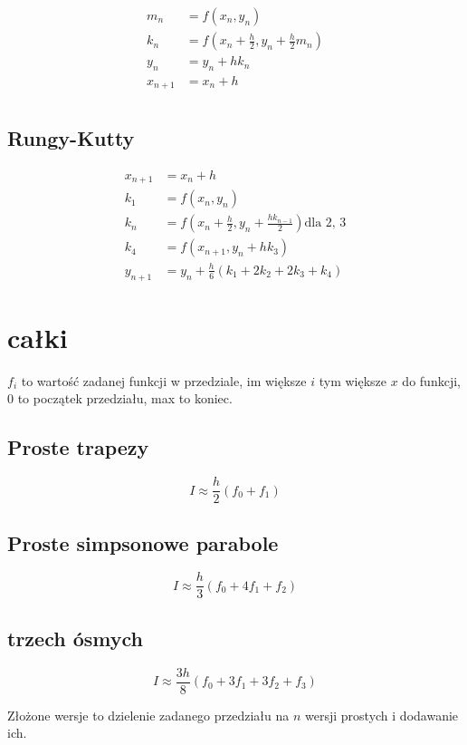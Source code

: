 \documentclass[a5paper,10pt]{article}
\begin{document}
\begin{multicols}{2}
    \begin{align*}
        m_n &= f(x_n, y_n) \\
        k_n &= f\left( x_n + \frac{h}{2}, y_n + \frac{h}{2}m_n \right)\\
        y_n &= y_n + hk_n \\
        x_{n + 1} &= x_{n} + h \\
    \end{align*}

    \subsection{Rungy-Kutty}

    \begin{align*}
        x_{n+1} &= x_n + h \\
        k_1 &= f(x_n, y_n) \\
        k_n &= f\left( x_n + \frac{h}{2}, y_n + \frac{hk_{n-1}}{2} \right)
            \text{dla 2, 3} \\
        k_4 &= f\left( x_{n+1}, y_n + hk_3 \right)\\
        y_{n+1} &= y_n + \frac{h}{6}\left( k_1 + 2k_2 + 2k_3 + k_4 \right)
    \end{align*}

    \section{całki}

    $f_i$ to wartość zadanej funkcji w przedziale, im większe $i$ tym większe
    $x$ do funkcji, 0 to początek przedziału, max to koniec.

    \subsection{Proste trapezy}

    \[
        I \approx \frac{h}{2}\left(f_0 + f_1 \right)
    \]

    \subsection{Proste simpsonowe parabole}
    \[
        I \approx \frac{h}{3}\left( f_0 + 4 f_1 + f_2 \right)
    \]
    
    \subsection{trzech ósmych}
    \[
        I \approx \frac{3h}{8}\left(f_0 + 3f_1 + 3f_2 + f_3\right)
    \]

    Złożone wersje to dzielenie zadanego przedziału na $n$ wersji prostych i
    dodawanie ich.
\end{multicols}
\end{document}

